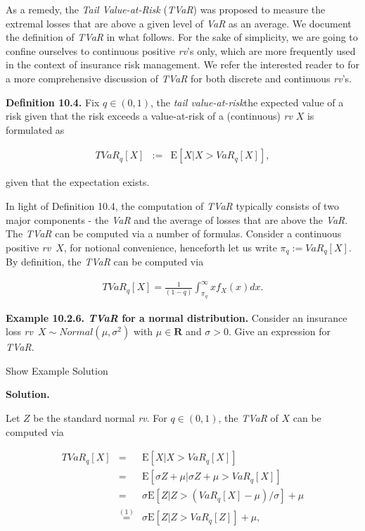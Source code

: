 \documentclass[]{book}
\theoremstyle{definition}
\theoremstyle{definition}
\theoremstyle{definition}
\theoremstyle{remark}
\begin{document}
As a remedy, the \emph{Tail Value-at-Risk} (\emph{TVaR}) was proposed to
measure the extremal losses that are above a given level of \emph{VaR}
as an average. We document the definition of \emph{TVaR} in what
follows. For the sake of simplicity, we are going to confine ourselves
to continuous positive \emph{rv}'s only, which are more frequently used
in the context of insurance risk management. We refer the interested
reader to \citet{hardy2006} for a more comprehensive discussion of
\emph{TVaR} for both discrete and continuous \emph{rv}'s.

\textbf{Definition 10.4.} Fix \(q\in (0,1)\), the \emph{tail
value-at-risk}{the expected value of a risk given that the risk exceeds
a value-at-risk} of a (continuous) \emph{rv} \(X\) is formulated as

\begin{eqnarray*}
  TVaR_q[X] &:=& \mathrm{E}[X|X>VaR_q[X]],
\end{eqnarray*}

given that the expectation exists.

In light of Definition 10.4, the computation of \emph{TVaR} typically
consists of two major components - the \emph{VaR} and the average of
losses that are above the \emph{VaR}. The \emph{TVaR} can be computed
via a number of formulas. Consider a continuous positive
\emph{rv}~\(X\), for notional convenience, henceforth let us write
\(\pi_q:=VaR_q[X]\). By definition, the \emph{TVaR} can be computed via

\begin{eqnarray}
TVaR_{q}[X]=\frac{1}{(1-q)}\int_{\pi_q}^{\infty}xf_X(x)dx.
\label{eq:cte-pdf}
\end{eqnarray}

\textbf{Example 10.2.6. \emph{TVaR} for a normal distribution.} Consider
an insurance loss \emph{rv}~\(X\sim Normal (\mu,\sigma^2)\) with
\(\mu\in \mathbf{R}\) and \(\sigma>0\). Give an expression for
\emph{TVaR}.

Show Example Solution

\hypertarget{toggleExamplePortMgt.2.6}{}
\textbf{Solution.}

Let \(Z\) be the standard normal \emph{rv}. For \(q\in(0,1)\), the
\emph{TVaR} of \(X\) can be computed via

\begin{eqnarray*}
  TVaR_q[X] &=& \mathrm{E}[X|X>VaR_q[X]]\\
&=&\mathrm{E}[\sigma Z+\mu|\sigma Z+\mu>VaR_q[X]]\\
&=& \sigma\mathrm{E}[Z|Z>(VaR_q[X]-\mu)/\sigma]+\mu\\
&\overset{(1)}{=}& \sigma\mathrm{E}[Z|Z>VaR_q[Z]]+\mu,
\end{eqnarray*}
\end{document}

